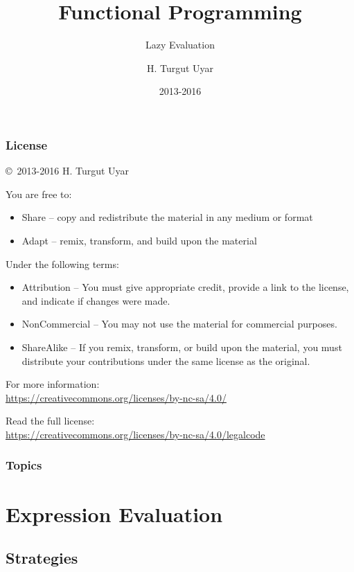 \documentclass[dvipsnames]{beamer}
\title{Functional Programming}
\subtitle{Lazy Evaluation}
\author{H. Turgut Uyar}
\date{2013-2016}
\theoremstyle{plain}
\begin{document}
\begin{frame}
  \titlepage
\end{frame}

\begin{frame}
  \frametitle{License}

  \hfill
  \copyright~2013-2016 H. Turgut Uyar

  \vfill
  \begin{footnotesize}
    You are free to:
    \begin{itemize}
      \itemsep0em
      \item Share -- copy and redistribute the material in any medium or format
      \item Adapt -- remix, transform, and build upon the material
    \end{itemize}

    Under the following terms:
    \begin{itemize}
      \itemsep0em
      \item Attribution -- You must give appropriate credit, provide a link to
        the license, and indicate if changes were made.

      \item NonCommercial -- You may not use the material for commercial
        purposes.

      \item ShareAlike -- If you remix, transform, or build upon the material,
        you must distribute your contributions under the same license as the
        original.
    \end{itemize}

    For more information:\\
    \url{https://creativecommons.org/licenses/by-nc-sa/4.0/}

    \smallskip
    Read the full license:\\
    \url{https://creativecommons.org/licenses/by-nc-sa/4.0/legalcode}
  \end{footnotesize}
\end{frame}

\begin{frame}
  \frametitle{Topics}
  \tableofcontents
\end{frame}

\section{Expression Evaluation}

\subsection{Strategies}
\end{document}
